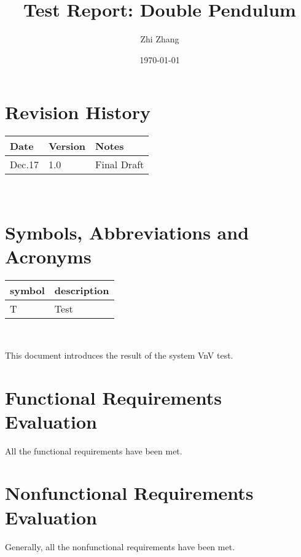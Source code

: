 \documentclass[12pt, titlepage]{article}
\begin{document}
\title{Test Report: Double Pendulum} 
\author{Zhi Zhang}
\date{\today}
	
\maketitle


\section{Revision History}

\begin{tabularx}{\textwidth}{p{3cm}p{2cm}X}
\toprule {\bf Date} & {\bf Version} & {\bf Notes}\\
\midrule
Dec.17 & 1.0 & Final Draft\\
 
\bottomrule
\end{tabularx}

~\newpage

\section{Symbols, Abbreviations and Acronyms}

\renewcommand{\arraystretch}{1.2}
\begin{tabular}{l l} 
  \toprule		
  \textbf{symbol} & \textbf{description}\\
  \midrule 
  T & Test\\
  \bottomrule
\end{tabular}\\

\newpage

\tableofcontents

\listoftables %

\listoffigures %

\newpage


This document introduces the result of the system VnV test. 

\section{Functional Requirements Evaluation}
All the functional requirements have been met. 

\section{Nonfunctional Requirements Evaluation}
Generally, all the nonfunctional requirements have been met.
\end{document}
